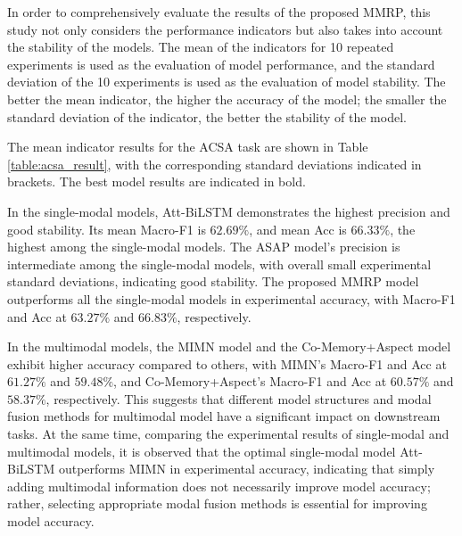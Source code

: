 \documentclass[preprint,12pt]{elsarticle}
\begin{document}
In order to comprehensively evaluate the results of the proposed MMRP, this study not only considers the performance indicators but also takes into account the stability of the models. The mean of the indicators for 10 repeated experiments is used as the evaluation of model performance, and the standard deviation of the 10 experiments is used as the evaluation of model stability. The better the mean indicator, the higher the accuracy of the model; the smaller the standard deviation of the indicator, the better the stability of the model. 

The mean indicator results for the ACSA task are shown in Table \ref{table:acsa_result}, with the corresponding standard deviations indicated in brackets. The best model results are indicated in bold.

In the single-modal models, Att-BiLSTM demonstrates the highest precision and good stability. Its mean Macro-F1 is $62.69\%$, and mean Acc is $66.33\%$, the highest among the single-modal models. The ASAP model's precision is intermediate among the single-modal models, with overall small experimental standard deviations, indicating good stability. The proposed MMRP model outperforms all the single-modal models in experimental accuracy, with Macro-F1 and Acc at $63.27\%$ and $66.83\%$, respectively.

In the multimodal models, the MIMN model and the Co-Memory+Aspect model exhibit higher accuracy compared to others, with MIMN's Macro-F1 and Acc at $61.27\%$ and $59.48\%$, and Co-Memory+Aspect's Macro-F1 and Acc at $60.57\%$ and $58.37\%$, respectively. This suggests that different model structures and modal fusion methods for multimodal model have a significant impact on downstream tasks. At the same time, comparing the experimental results of single-modal and multimodal models, it is observed that the optimal single-modal model Att-BiLSTM outperforms MIMN in experimental accuracy, indicating that simply adding multimodal information does not necessarily improve model accuracy; rather, selecting appropriate modal fusion methods is essential for improving model accuracy.
\end{document}
